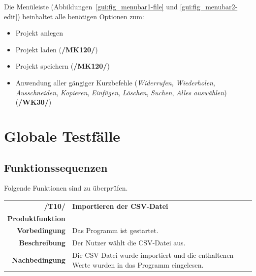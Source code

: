 \documentclass{article}
\begin{document}
Die Menüleiste (Abbildungen~\ref{gui:fig_menubar1-file} und \ref{gui:fig_menubar2-edit}) beinhaltet alle benötigen Optionen zum:
\begin{itemize}
    \item Projekt anlegen
    \item Projekt laden (\textbf{/MK120/})
    \item Projekt speichern (\textbf{/MK120/})
    \item Anwendung aller gängiger Kurzbefehle (\emph{Widerrufen}, \emph{Wiederholen}, \emph{Ausschneiden}, \emph{Kopieren}, \emph{Einfügen}, \emph{Löschen}, \emph{Suchen}, \emph{Alles auswählen}) (\textbf{/WK30/})
\end{itemize}

\clearpage
\section{Globale Testfälle}

\subsection{Funktionssequenzen}
Folgende Funktionen sind zu überprüfen.

\begin{table}[H]
\begin{tabularx}{\textwidth}{rX}
\vspace{1mm}
\textbf{/T10/}         & \textbf{Importieren der CSV-Datei} \\ \vspace{1mm}
\textbf{Produktfunktion} & \nameref{sec:f:Projekt laden}\\ \vspace{1mm}
\textbf{Vorbedingung}  & Das Programm ist gestartet. \\ \vspace{1mm}
\textbf{Beschreibung}  & Der Nutzer wählt die CSV-Datei aus. \\
\textbf{Nachbedingung} & Die CSV-Datei wurde importiert und die enthaltenen Werte wurden in das Programm eingelesen.
\end{tabularx}
\end{table}
\end{document}
